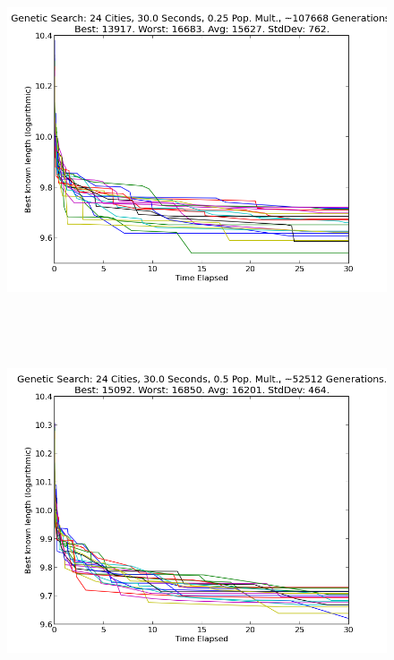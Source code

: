 \documentclass[10pt, conference, compsocconf]{IEEEtran}
\begin{document}
\newpage
$ $
\newpage
\begin{figure}[t]
  \centering
    \includegraphics[width=1\textwidth]{../Example_Output_Images/24_cities/30_seconds/geneticSearch_025_populationMuliplier.png}
\end{figure}
$ $


\newpage
$ $
\newpage
\begin{figure}[t]
  \centering
    \includegraphics[width=1\textwidth]{../Example_Output_Images/24_cities/30_seconds/geneticSearch_05_populationMuliplier.png}
\end{figure}
$ $
\end{document}
